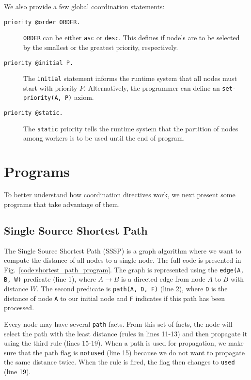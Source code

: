 We also provide a few global coordination statements:

\begin{description}
   \item[\texttt{priority @order ORDER.}] \texttt{ORDER} can be either \texttt{asc} or \texttt{desc}. This defines if node's are to be selected by the smallest or the greatest priority, respectively.
   \item[\texttt{priority @initial P.}] The \texttt{initial} statement informs the runtime system that all nodes must start with priority $P$. Alternatively, the programmer can define an \texttt{set-priority(A, P)} axiom.
   \item[\texttt{priority @static.}] The \texttt{static} priority tells the runtime system that the partition of nodes among workers is to be used until the end of program. 
\end{description}

\section{Programs}

To better understand how coordination directives work, we next present some programs that
take advantage of them.

\subsection{Single Source Shortest Path}

The Single Source Shortest Path (SSSP) is a graph algorithm where we want to compute the
distance of all nodes to a single node. The full code is presented in Fig.~\ref{code:shortest_path_program}.
The graph is represented using the \texttt{edge(A, B, W)} predicate (line 1), where $A \rightarrow B$ is a directed edge
from node $A$ to $B$ with distance $W$. The second
predicate is \texttt{path(A, D, F)} (line 2), where \texttt{D} is the distance of node \texttt{A} to our initial node and \texttt{F}
indicates if this path has been processed.

Every node may have several \texttt{path} facts. From this set of facts, the node will select
the path with the least distance (rules in lines 11-13) and then propagate it using the third rule (lines 15-19).
When a path is used for propagation, we make sure that the path flag is \texttt{notused} (line 15)
because we do not want to propagate the same distance twice. When the rule is fired, the flag
then changes to \texttt{used} (line 19).

